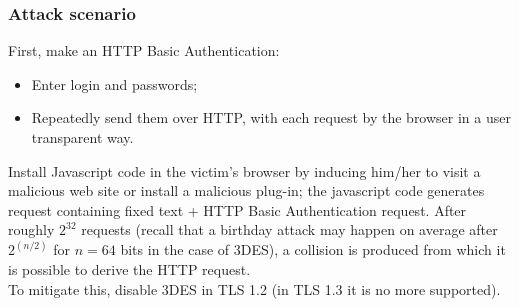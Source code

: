 \documentclass[a4paper, 10pt, titlepage]{article}
\begin{document}
\subsubsection*{Attack scenario}
First, make an HTTP Basic Authentication:
\begin{itemize}
\item Enter login and passwords;
\item Repeatedly send them over HTTP, with each request by the browser in a user transparent way.
\end{itemize}
Install Javascript code in the victim’s browser by inducing him/her to visit a malicious web site or install a malicious plug-in; the javascript code generates request containing fixed text + HTTP Basic Authentication request. After roughly $2^{32}$ requests (recall that a birthday attack may happen on average after $2^{(n/2)}$ for $n=64$ bits in the case of 3DES), a collision is produced from which it is possible to derive the HTTP request. \\
To mitigate this, disable 3DES in TLS 1.2 (in TLS 1.3 it is no more supported).
\end{document}
